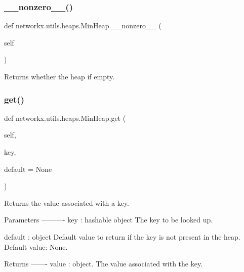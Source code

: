 \subsubsection{\texorpdfstring{\+\_\+\+\_\+nonzero\+\_\+\+\_\+()}{\_\_nonzero\_\_()}}
{\footnotesize\ttfamily def networkx.\+utils.\+heaps.\+Min\+Heap.\+\_\+\+\_\+nonzero\+\_\+\+\_\+ (\begin{DoxyParamCaption}\item[{}]{self }\end{DoxyParamCaption})}

\begin{DoxyVerb}Returns whether the heap if empty.\end{DoxyVerb}
 \mbox{\label{classnetworkx_1_1utils_1_1heaps_1_1MinHeap_a223ebafd83fab0dfac350a82745b8026}} 
\subsubsection{\texorpdfstring{get()}{get()}}
{\footnotesize\ttfamily def networkx.\+utils.\+heaps.\+Min\+Heap.\+get (\begin{DoxyParamCaption}\item[{}]{self,  }\item[{}]{key,  }\item[{}]{default = {\ttfamily None} }\end{DoxyParamCaption})}

\begin{DoxyVerb}Returns the value associated with a key.

Parameters
----------
key : hashable object
    The key to be looked up.

default : object
    Default value to return if the key is not present in the heap.
    Default value: None.

Returns
-------
value : object.
    The value associated with the key.
\end{DoxyVerb}
 \mbox{\label{classnetworkx_1_1utils_1_1heaps_1_1MinHeap_af63fb33348bce3bd8e8e088e907ec6dd}} 
